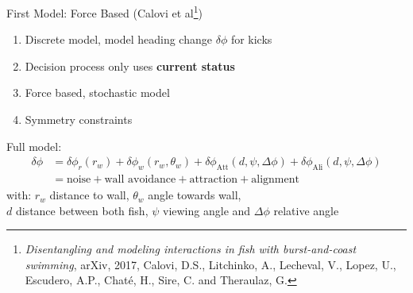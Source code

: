\documentclass{beamer}
\begin{document}
\begin{frame}
\begin{columns}

\end{columns}
\end{frame}

\begin{frame}{First Model: Force Based (Calovi et al\footnote{\hspace*{0.1cm}\textit{Disentangling and modeling interactions in fish with burst-and-coast swimming}, arXiv, 2017, Calovi, D.S., Litchinko, A., Lecheval, V., Lopez, U., Escudero, A.P., Chaté, H., Sire, C. and Theraulaz, G.})}
\begin{enumerate}
\item Discrete model, model heading change $\delta \phi$ for kicks
\item Decision process only uses \textbf{current status}
\item Force based, stochastic model
\item Symmetry constraints 
\end{enumerate}
Full model:
\begin{align*}
  \label{eq:calovi-model}
  \delta \phi &= \delta \phi_r (r_w) + \delta \phi_w (r_w, \theta_w) + \delta \phi_\text{Att} (d, \psi, \Delta \phi) + \delta \phi_\text{Ali}  (d, \psi, \Delta \phi) \\
  &= \text{noise} + \text{wall avoidance} + \text{attraction} + \text{alignment}
\end{align*}
with: $r_w$ distance to wall, $\theta_w$ angle towards wall,\\ $d$ distance between both fish, $\psi$ viewing angle and $\Delta \phi$ relative angle
\end{frame}
\end{document}
